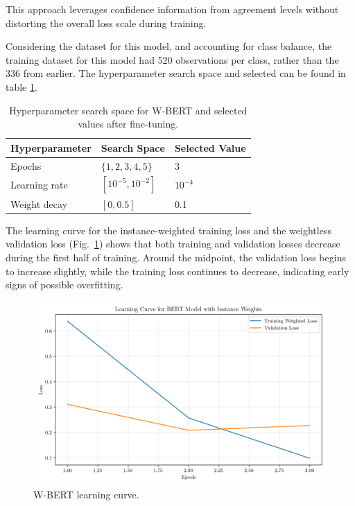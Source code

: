 \documentclass[conference]{IEEEtran}
\begin{document}
This approach leverages confidence information from agreement levels without distorting the overall loss scale during training.

Considering the dataset for this model, and accounting for class balance, the training dataset for this model had 520 observations per class, rather than the 336 from earlier. The hyperparameter search space and selected can be found in table \ref{parameters_wbert}.

\begin{table}[H]
\centering
\caption{Hyperparameter search space for W-BERT and selected values after fine-tuning.}
\label{parameters_wbert}
\begin{tabular}{lll}
\toprule
\textbf{Hyperparameter} & \textbf{Search Space} & \textbf{Selected Value} \\
\midrule
Epochs & $\{1, 2, 3, 4, 5\}$ & 3 \\
Learning rate & $[10^{-5}, 10^{-2}]$ & $10^{-4}$ \\
Weight decay & $[0, 0.5]$ & 0.1 \\
\bottomrule
\end{tabular}
\end{table}

The learning curve for the instance-weighted training loss and the weightless validation loss (Fig.~\ref{fig:weighted_bert_learning_curve}) shows that both training and validation losses decrease during the first half of training. Around the midpoint, the validation loss begins to increase slightly, while the training loss continues to decrease, indicating early signs of possible overfitting.

\begin{figure}[H]
    \centering
    \includegraphics[width=1\linewidth]{assets/weighted_bert_learning_curve.png}
    \caption{W-BERT learning curve.}
    \label{fig:weighted_bert_learning_curve}
\end{figure}
\end{document}
